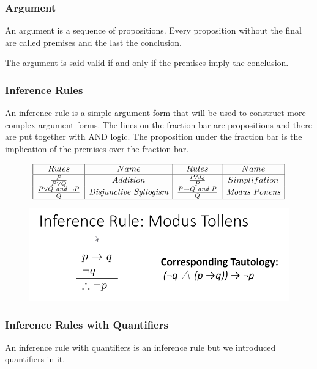 \documentclass{article}
\begin{document}
\subsubsection{Argument} An argument is a sequence of propositions. Every proposition without the final are called premises and the last the conclusion. 
\begin{tcolorbox}[width=12.1cm, leftrule=3mm]
The argument is said valid if and only if the premises imply the conclusion.
\end{tcolorbox}

\subsubsection{Inference Rules} An inference rule is a simple argument form that will be used to construct more complex argument forms. The lines on the fraction bar are propositions and there are put together with AND logic. The proposition under the fraction bar is the implication of the premises over the fraction bar.

\begin{center}
\[
\begin{array}{|c|c|c|c|} \hline
Rules & Name & Rules & Name\\ \hline
\frac{P}{P \vee Q} & Addition & \frac{P \wedge Q}{P} & Simplifation \\
\frac{P \vee Q \textit{ and } \neg P}{Q} & \textit{Disjunctive Syllogism} & \frac{P \rightarrow Q \textit{ and } P}{Q} & \textit{Modus Ponens} \\
\hline
\end{array}
\]
\end{center}

\begin{figure}[h]
  \includegraphics[width=\linewidth]{inferencerule.png}
  \label{fig:visualization}
\end{figure}


\subsubsection{Inference Rules with Quantifiers} An inference rule with quantifiers is an inference rule but we introduced quantifiers in it.
\end{document}
